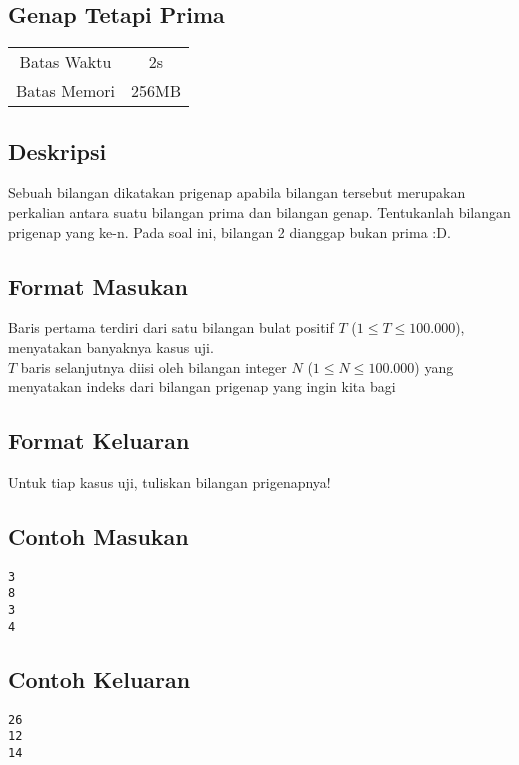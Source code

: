 \documentclass{article}
\begin{document}
\begin{center}

    
    \section*{Genap Tetapi Prima} %

    \begin{tabular}{ | c c | }
        \hline
        Batas Waktu  & 2s \\    %
        Batas Memori & 256MB \\  %
        \hline
    \end{tabular}
\end{center}

\subsection*{Deskripsi}
Sebuah bilangan dikatakan prigenap apabila bilangan tersebut merupakan perkalian antara suatu bilangan prima dan bilangan genap. Tentukanlah bilangan prigenap yang ke-n. Pada soal ini, bilangan 2 dianggap bukan prima :D.

\subsection*{Format Masukan}

Baris pertama terdiri dari satu bilangan bulat positif $T$ ($1 \leq T \leq 100.000$), menyatakan banyaknya kasus uji.\\
$T$ baris selanjutnya diisi oleh bilangan integer $N$ ($1 \leq N \leq 100.000$) yang menyatakan indeks dari bilangan prigenap yang ingin kita bagi

\subsection*{Format Keluaran}

Untuk tiap kasus uji, tuliskan bilangan prigenapnya!
\\

\begin{multicols}{2}
\subsection*{Contoh Masukan}
\begin{lstlisting}
3
8
3
4
\end{lstlisting}
\columnbreak
\subsection*{Contoh Keluaran}
\begin{lstlisting}
26
12
14
\end{lstlisting}
\vfill
\null
\end{multicols}
\end{document}
